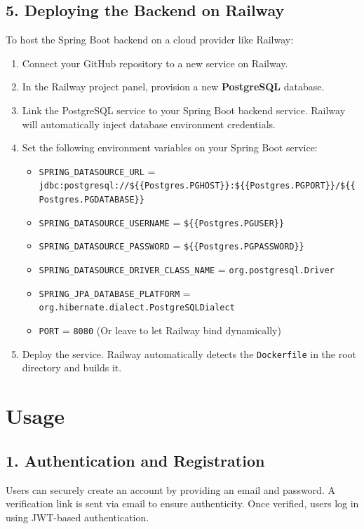 \documentclass[12pt,a4paper]{article}
\begin{document}
\subsection{5. Deploying the Backend on Railway}
To host the Spring Boot backend on a cloud provider like Railway:
\begin{enumerate}
    \item Connect your GitHub repository to a new service on Railway.
    \item In the Railway project panel, provision a new \textbf{PostgreSQL} database.
    \item Link the PostgreSQL service to your Spring Boot backend service. Railway will automatically inject database environment credentials.
    \item Set the following environment variables on your Spring Boot service:
    \begin{itemize}
        \item \texttt{SPRING\_DATASOURCE\_URL} = \texttt{jdbc:postgresql://\$\{\{Postgres.PGHOST\}\}:\$\{\{Postgres.PGPORT\}\}/\$\{\{Postgres.PGDATABASE\}\}}
        \item \texttt{SPRING\_DATASOURCE\_USERNAME} = \texttt{\$\{\{Postgres.PGUSER\}\}}
        \item \texttt{SPRING\_DATASOURCE\_PASSWORD} = \texttt{\$\{\{Postgres.PGPASSWORD\}\}}
        \item \texttt{SPRING\_DATASOURCE\_DRIVER\_CLASS\_NAME} = \texttt{org.postgresql.Driver}
        \item \texttt{SPRING\_JPA\_DATABASE\_PLATFORM} = \texttt{org.hibernate.dialect.PostgreSQLDialect}
        \item \texttt{PORT} = \texttt{8080} (Or leave to let Railway bind dynamically)
    \end{itemize}
    \item Deploy the service. Railway automatically detects the \texttt{Dockerfile} in the root directory and builds it.
\end{enumerate}

\section{Usage}

\subsection{1. Authentication and Registration}
Users can securely create an account by providing an email and password. A verification link is sent via email to ensure authenticity. Once verified, users log in using JWT-based authentication.
\end{document}
